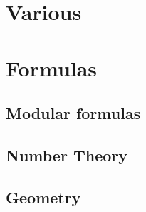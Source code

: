 \chapter{Various}



\chapter{Formulas}

\section{Modular formulas}


\section{Number Theory}









\section{Geometry}



